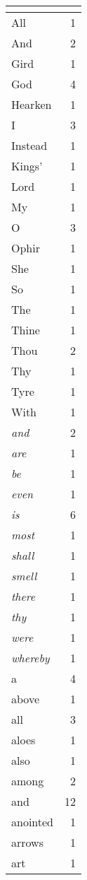 \begin{center}
\begin{longtable}{l|r}
\hline \multicolumn{2}{c}{{ }} \\ \hline
\endfoot 
All & 1\\ \hline 
And & 2\\ \hline 
Gird & 1\\ \hline 
God & 4\\ \hline 
Hearken & 1\\ \hline 
I & 3\\ \hline 
Instead & 1\\ \hline 
Kings' & 1\\ \hline 
Lord & 1\\ \hline 
My & 1\\ \hline 
O & 3\\ \hline 
Ophir & 1\\ \hline 
She & 1\\ \hline 
So & 1\\ \hline 
The & 1\\ \hline 
Thine & 1\\ \hline 
Thou & 2\\ \hline 
Thy & 1\\ \hline 
Tyre & 1\\ \hline 
With & 1\\ \hline 
\emph{and} & 2\\ \hline 
\emph{are} & 1\\ \hline 
\emph{be} & 1\\ \hline 
\emph{even} & 1\\ \hline 
\emph{is} & 6\\ \hline 
\emph{most} & 1\\ \hline 
\emph{shall} & 1\\ \hline 
\emph{smell} & 1\\ \hline 
\emph{there} & 1\\ \hline 
\emph{thy} & 1\\ \hline 
\emph{were} & 1\\ \hline 
\emph{whereby} & 1\\ \hline 
a & 4\\ \hline 
above & 1\\ \hline 
all & 3\\ \hline 
aloes & 1\\ \hline 
also & 1\\ \hline 
among & 2\\ \hline 
and & 12\\ \hline 
anointed & 1\\ \hline 
arrows & 1\\ \hline 
art & 1\\ \hline 

\end{longtable}
\end{center}
